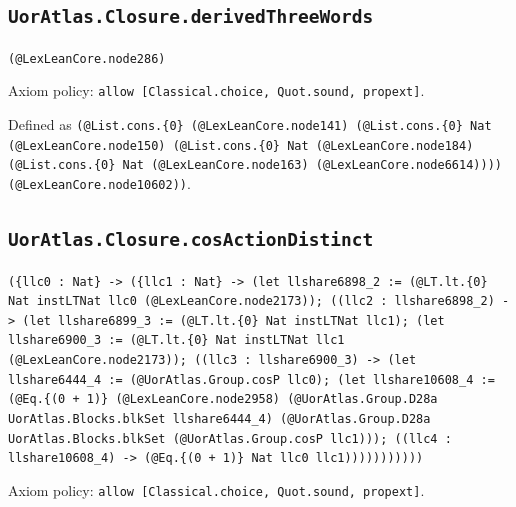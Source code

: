 \documentclass[11pt]{article}
\begin{document}
\subsection*{\texttt{UorAtlas.Closure.derivedThreeWords}}
\noindent\texttt{(@LexLeanCore.node286)}\par
\noindent Axiom policy: \texttt{allow [Classical.choice, Quot.sound, propext]}.\par
\noindent Defined as \texttt{(@List.cons.\{0\} (@LexLeanCore.node141) (@List.cons.\{0\} Nat (@LexLeanCore.node150) (@List.cons.\{0\} Nat (@LexLeanCore.node184) (@List.cons.\{0\} Nat (@LexLeanCore.node163) (@LexLeanCore.node6614)))) (@LexLeanCore.node10602))}.\par
\subsection*{\texttt{UorAtlas.Closure.cosActionDistinct}}
\noindent\texttt{(\{llc0 : Nat\} -> (\{llc1 : Nat\} -> (let llshare6898\_2 := (@LT.lt.\{0\} Nat instLTNat llc0 (@LexLeanCore.node2173)); ((llc2 : llshare6898\_2) -> (let llshare6899\_3 := (@LT.lt.\{0\} Nat instLTNat llc1); (let llshare6900\_3 := (@LT.lt.\{0\} Nat instLTNat llc1 (@LexLeanCore.node2173)); ((llc3 : llshare6900\_3) -> (let llshare6444\_4 := (@UorAtlas.Group.cosP llc0); (let llshare10608\_4 := (@Eq.\{(0 + 1)\} (@LexLeanCore.node2958) (@UorAtlas.Group.D28a UorAtlas.Blocks.blkSet llshare6444\_4) (@UorAtlas.Group.D28a UorAtlas.Blocks.blkSet (@UorAtlas.Group.cosP llc1))); ((llc4 : llshare10608\_4) -> (@Eq.\{(0 + 1)\} Nat llc0 llc1)))))))))))}\par
\noindent Axiom policy: \texttt{allow [Classical.choice, Quot.sound, propext]}.\par
\end{document}
